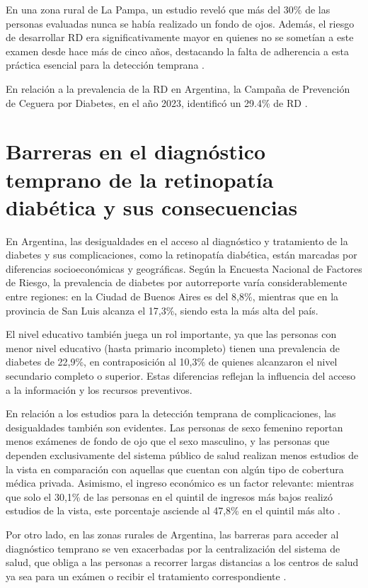 En una zona rural de La Pampa, un estudio reveló que más del 30\% de las personas evaluadas nunca se había realizado un fondo de ojos. Además, el riesgo de desarrollar RD era significativamente mayor en quienes no se sometían a este examen desde hace más de cinco años, destacando la falta de adherencia a esta práctica esencial para la detección temprana \parencites{ortizbasso2022}.

En relación a la prevalencia de la RD en Argentina, la Campaña de Prevención de Ceguera por Diabetes, en el año 2023, identificó un 29.4\% de RD \parencites{oftalmologos2023}.


\section{Barreras en el diagnóstico temprano de la retinopatía diabética y sus consecuencias}
En Argentina, las desigualdades en el acceso al diagnóstico y tratamiento de la diabetes y sus complicaciones, como la retinopatía diabética, están marcadas por diferencias socioeconómicas y geográficas. Según la Encuesta Nacional de Factores de Riesgo, la prevalencia de diabetes por autorreporte varía considerablemente entre regiones: en la Ciudad de Buenos Aires es del 8,8\%, mientras que en la provincia de San Luis alcanza el 17,3\%, siendo esta la más alta del país.

El nivel educativo también juega un rol importante, ya que las personas con menor nivel educativo (hasta primario incompleto) tienen una prevalencia de diabetes de 22,9\%, en contraposición al 10,3\% de quienes alcanzaron el nivel secundario completo o superior. Estas diferencias reflejan la influencia del acceso a la información y los recursos preventivos.

En relación a los estudios para la detección temprana de complicaciones, las desigualdades también son evidentes. Las personas de sexo femenino reportan menos exámenes de fondo de ojo que el sexo masculino, y las personas que dependen exclusivamente del sistema público de salud realizan menos estudios de la vista en comparación con aquellas que cuentan con algún tipo de cobertura médica privada. Asimismo, el ingreso económico es un factor relevante: mientras que solo el 30,1\% de las personas en el quintil de ingresos más bajos realizó estudios de la vista, este porcentaje asciende al 47,8\% en el quintil más alto \parencites{indec2019}.

Por otro lado, en las zonas rurales de Argentina, las barreras para acceder al diagnóstico temprano se ven exacerbadas por la centralización del sistema de salud, que obliga a las personas a recorrer largas distancias a los centros de salud ya sea para un exámen o recibir el tratamiento correspondiente \parencites{ortizbasso2020}.

